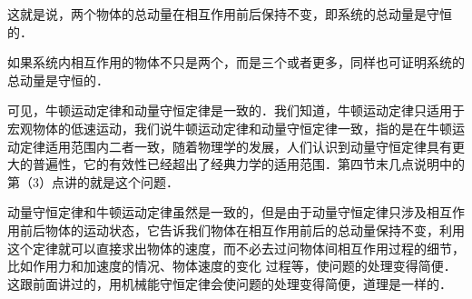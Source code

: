 这就是说，两个物体的总动量在相互作用前后保持不变，即系统的总动量是守恒的．

如果系统内相互作用的物体不只是两个，而是三个或者更多，同样也可证明系统的总动量是守恒的．

可见，牛顿运动定律和动量守恒定律是一致的．我们知道，牛顿运动定律只适用于宏观物体的低速运动，我们说牛顿运动定律和动量守恒定律一致，指的是在牛顿运动定律适用范围内二者一致，随着物理学的发展，人们认识到动量守恒定律具有更大的普遍性，它的有效性已经超出了经典力学的适用范围．第四节末几点说明中的第（3）点讲的就是这个问题．

动量守恒定律和牛顿运动定律虽然是一致的，但是由于动量守恒定律只涉及相互作用前后物体的运动状态，它告诉我们物体在相互作用前后的总动量保持不变，利用这个定律就可以直接求出物体的速度，而不必去过问物体间相互作用过程的细节，比如作用力和加速度的情况、物体速度的变化
过程等，使问题的处理变得简便．这跟前面讲过的，用机械能守恒定律会使问题的处理变得简便，道理是一样的．

\newpage
